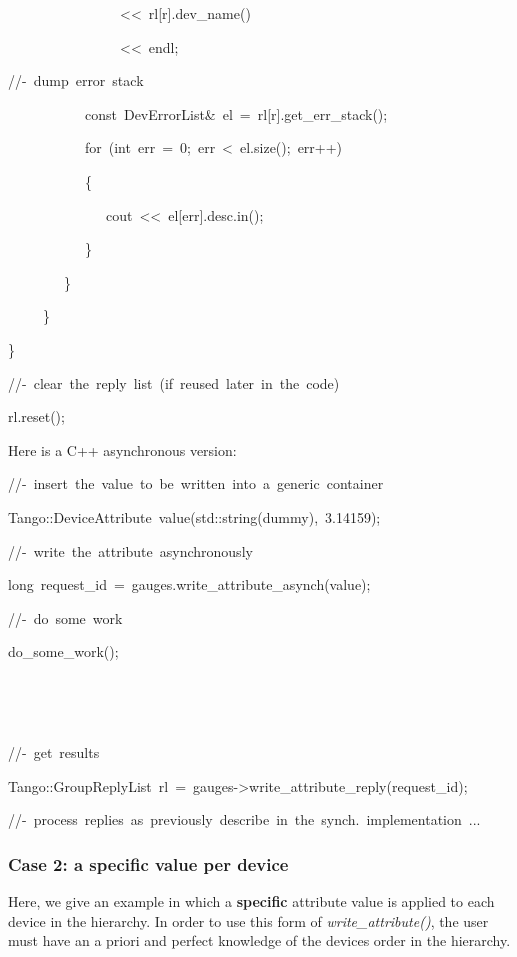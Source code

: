 \begin{lyxcode}
~~~~~~~~~~~~~~~~<\textcompwordmark{}<~rl{[}r{]}.dev\_name()

~~~~~~~~~~~~~~~~<\textcompwordmark{}<~endl;

//-~dump~error~stack

~~~~~~~~~~~const~DevErrorList\&~el~=~rl{[}r{]}.get\_err\_stack();

~~~~~~~~~~~for~(int~err~=~0;~err~<~el.size();~err++)

~~~~~~~~~~~\{

~~~~~~~~~~~~~~cout~<\textcompwordmark{}<~el{[}err{]}.desc.in();

~~~~~~~~~~~\}

~~~~~~~~\}

~~~~~\}

\}

//-~clear~the~reply~list~(if~reused~later~in~the~code)

rl.reset();
\end{lyxcode}


Here is a C++ asynchronous version:


\begin{lyxcode}
//-~insert~the~value~to~be~written~into~a~generic~container

Tango::DeviceAttribute~value(std::string(\textquotedbl{}dummy\textquotedbl{}),~3.14159);

//-~write~the~attribute~asynchronously

long~request\_id~=~gauges.write\_attribute\_asynch(value);

//-~do~some~work

do\_some\_work();

~

~

//-~get~results

Tango::GroupReplyList~rl~=~gauges->write\_attribute\_reply(request\_id);

//-~process~replies~as~previously~describe~in~the~synch.~implementation~...
\end{lyxcode}



\subsubsection{Case 2: a specific value per device\label{sub:Case-2-writing}}

Here, we give an example in which a \textbf{specific} attribute value
is applied to each device in the hierarchy. In order to use this form
of \emph{write\_attribute()}, the user must have an \textquotedbl{}a
priori\textquotedbl{} and \textquotedbl{}perfect\textquotedbl{} knowledge
of the devices order in the hierarchy. 

